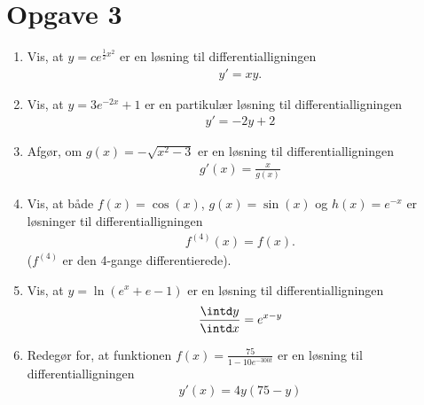 \section*{Opgave 3}

\begin{enumerate}[label=\roman*)]
	\item Vis, at $y = ce^{\frac{1}{2}x^2}$ er en løsning til differentialligningen
	\begin{align*}
		y' = xy.
	\end{align*}
	\item Vis, at $y = 3e^{-2x} + 1$ er en partikulær løsning til differentialligningen
	\begin{align*}
		y' = -2y+2
	\end{align*}
	\item Afgør, om $g(x) = -\sqrt{x^2-3}$ er en løsning til differentialligningen
	\begin{align*}
		g'(x) = \frac{x}{g(x)}
	\end{align*}
	\item Vis, at både $f(x) = \cos(x)$, $g(x) = \sin(x)$ og $h(x) = e^{-x}$ er løsninger til differentialligningen
	\begin{align*}
		f^{(4)}(x) = f(x).
	\end{align*}
	($f^{(4)}$ er den 4-gange differentierede).
	\item Vis, at $y = \ln(e^{x}+e-1)$ er en løsning til differentialligningen
	\begin{align*}
		\frac{\intd y}{\intd x} = e^{x-y}
	\end{align*}
	\item Redegør for, at funktionen $f(x) = \frac{75}{1-10e^{-300t}}$ er en løsning til differentialligningen
	\begin{align*}
		y'(x) = 4y(75-y)
	\end{align*}
\end{enumerate}